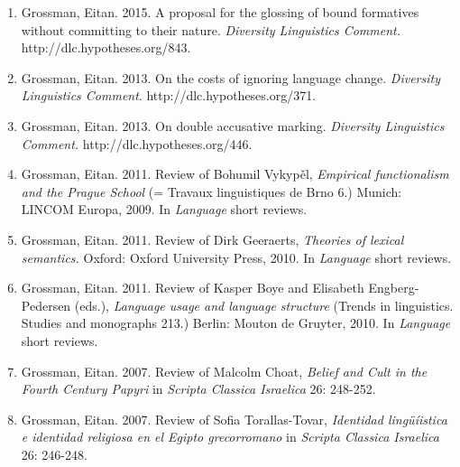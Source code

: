 \documentclass[letterpaper,11pt]{article}
\begin{document}
\begin{enumerate}[resume]
\vspace{-0.025 in}
\vspace*{-8pt}
\item Grossman, Eitan. 2015. A proposal for the glossing of bound formatives without committing to their nature. \textit{Diversity Linguistics Comment.} http://dlc.hypotheses.org/843.

\item Grossman, Eitan. 2013. On the costs of ignoring language change. \textit{Diversity Linguistics Comment}. http://dlc.hypotheses.org/371.

\item Grossman, Eitan. 2013. On double accusative marking. \textit{Diversity Linguistics Comment.} http://dlc.hypotheses.org/446.

\item Grossman, Eitan. 2011. Review of Bohumil Vykypěl, \textit{Empirical functionalism and the Prague School} (= Travaux linguistiques de Brno 6.) Munich: LINCOM Europa, 2009. In \textit{Language} short reviews.

\item Grossman, Eitan. 2011. Review of Dirk Geeraerts, \textit{Theories of lexical semantics.} Oxford: Oxford University Press, 2010. In \textit{Language} short reviews.

\item Grossman, Eitan. 2011. Review of Kasper Boye and Elisabeth Engberg-Pedersen (eds.), \textit{Language usage and language structure} (Trends in linguistics. Studies and monographs 213.) Berlin: Mouton de Gruyter, 2010. In \textit{Language} short reviews.

\item Grossman, Eitan. 2007. Review of Malcolm Choat, \textit{Belief and Cult in the Fourth Century Papyri} in \textit{Scripta Classica Israelica} 26: 248-252.

\item Grossman, Eitan. 2007. Review of Sofia Torallas-Tovar, \textit{Identidad lingüíistica e identidad religiosa en el Egipto grecorromano} in \textit{Scripta Classica Israelica} 26: 246-248.
\end{enumerate}
\end{document}
